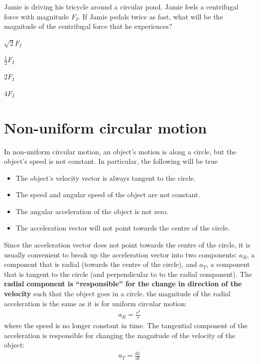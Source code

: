 \begin{checkpoint}
\begin{MCquestion}{Jamie is driving his tricycle around a circular pond. Jamie feels a centrifugal force with magnitude $F_I$. If Jamie pedals twice as fast, what will be the magnitude of the centrifugal force that he experiences?}
\item $\sqrt{2}F_I$
\item $\frac{1}{2}F_I$
\item $2F_I$
\item $4F_I$\correct
\end{MCquestion}
\end{checkpoint}
\newpage
\section{Non-uniform circular motion}
In non-uniform circular motion, an object's motion is along a circle, but the object's speed is not constant. In particular, the following will be true
\begin{itemize}
\item The object's velocity vector is always tangent to the circle.
\item The speed and angular speed of the object are not constant.
\item The angular acceleration of the object is not zero.
\item The acceleration vector will not point towards the centre of the circle. 
\end{itemize}
Since the acceleration vector does not point towards the centre of the circle, it is usually convenient to break up the acceleration vector into two components: $a_R$, a component that is radial (towards the centre of the circle), and $a_T$, a component that is tangent to the circle (and perpendicular to to the radial component). The \textbf{radial component is ``responsible'' for the change in direction of the velocity} such that the object goes in a circle. the magnitude of the radial acceleration is the same as it is for uniform circular motion:
\begin{align*}
a_R=\frac{v^2}{r}
\end{align*}
where the speed is no longer constant in time. The tangential component of the acceleration is responsible for changing the magnitude of the velocity of the object:
\begin{align*}
a_T = \frac{dv}{dt}
\end{align*}
\vspace{-0.25cm}
